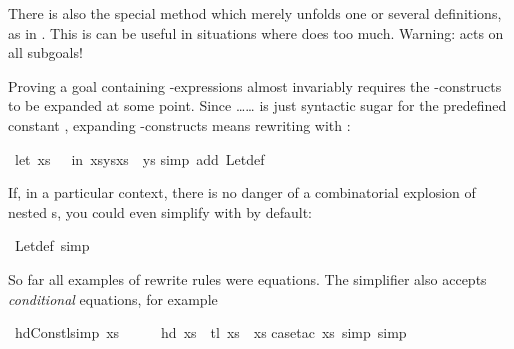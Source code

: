 \begin{isabellebody}
\begin{isamarkuptext}
There is also the special method 
which merely unfolds
one or several definitions, as in .
This is can be useful in situations where  does too much.
Warning:  acts on all subgoals!%
\end{isamarkuptext}%
\isamarkuptrue%
%
\isamarkuptrue%
%
\begin{isamarkuptext}%
%
Proving a goal containing -expressions almost invariably requires the
-con\-structs to be expanded at some point. Since
\ldots\isa{=}\ldots{} is just syntactic sugar for
the predefined constant , expanding -constructs
means rewriting with :%
\end{isamarkuptext}%
\isamarkuptrue%
\ {\isachardoublequote}{\isacharparenleft}let\ xs\ {\isacharequal}\ {\isacharbrackleft}{\isacharbrackright}\ in\ xs{\isacharat}ys{\isacharat}xs{\isacharparenright}\ {\isacharequal}\ ys{\isachardoublequote}\isanewline
\isamarkupfalse%
simp\ add{\isacharcolon}\ Let{\isacharunderscore}def{\isacharparenright}\isanewline
\isamarkupfalse%
\isamarkupfalse%
%
\begin{isamarkuptext}%
If, in a particular context, there is no danger of a combinatorial explosion
of nested s, you could even simplify with  by
default:%
\end{isamarkuptext}%
\isamarkuptrue%
\ Let{\isacharunderscore}def\ {\isacharbrackleft}simp{\isacharbrackright}\isamarkupfalse%
%
\isamarkuptrue%
%
\begin{isamarkuptext}%
%
So far all examples of rewrite rules were equations. The simplifier also
accepts \emph{conditional} equations, for example%
\end{isamarkuptext}%
\isamarkuptrue%
\ hd{\isacharunderscore}Cons{\isacharunderscore}tl{\isacharbrackleft}simp{\isacharbrackright}{\isacharcolon}\ {\isachardoublequote}xs\ {\isasymnoteq}\ {\isacharbrackleft}{\isacharbrackright}\ \ {\isasymLongrightarrow}\ \ hd\ xs\ {\isacharhash}\ tl\ xs\ {\isacharequal}\ xs{\isachardoublequote}\isanewline
\isamarkupfalse%
case{\isacharunderscore}tac\ xs{\isacharcomma}\ simp{\isacharcomma}\ simp{\isacharparenright}\isanewline

\end{isabellebody}
